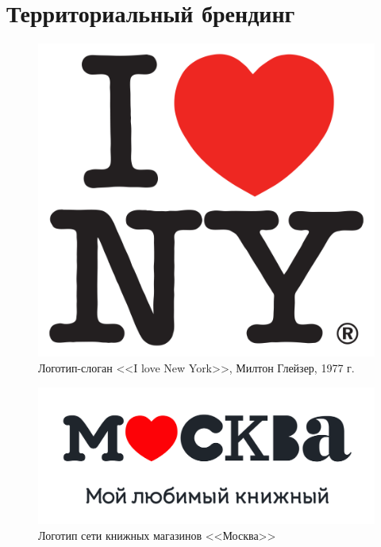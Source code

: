 \section{Территориальный брендинг}
\label{app:territorial}

\begin{figure}[ht]
  \centering
  \includegraphics[width=.5\linewidth]{images/supplement/territorial/ny}
  \caption{Логотип-слоган <<I love New York>>, Милтон Глейзер, 1977 г.}
  \label{fig:territorial:ny}
\end{figure}

\begin{figure}[ht]
  \centering
  \includegraphics[width=.5\linewidth]{images/supplement/territorial/moscow}
  \caption{Логотип сети книжных магазинов <<Москва>>}
  \label{fig:territorial:moscow}
\end{figure}
